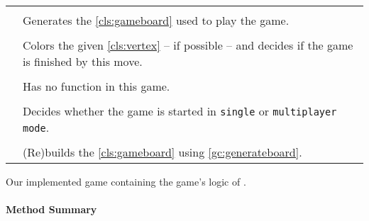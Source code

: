 \paragraph*{}
\begin{longtable}{Lp{10cm}}
	\startmethodtable
	 \\
	& Generates the \ref{cls:gameboard} used to play the game. \\
	 \\
	& Colors the given \ref{cls:vertex} -- if possible -- and decides if the game is finished by this move. \\
	 \\
	& Has no function in this game. \\
	 \\
	& Decides whether the game is started in \texttt{single} or \texttt{multiplayer mode}. \\
	 \\
	& (Re)builds the \ref{cls:gameboard} using \ref{gc:generateboard}. \\
	\hline
\end{longtable}

\pagebreak

Our implemented game containing the game's logic of \twixt. \\

\centerdash

\paragraph*{Method Summary}
